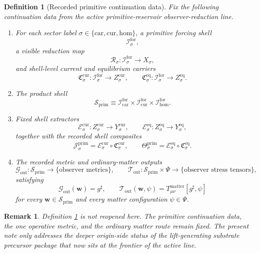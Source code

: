 \documentclass[11pt]{article}
\newcommand{\CompletedMetric}{g^{\sharp}}
\newcommand{\Car}{\mathrm{car}}
\newcommand{\Cur}{\mathrm{cur}}
\newcommand{\Hom}{\mathrm{hom}}
\newcommand{\ForSpace}[1]{\mathcal I_{#1}^{\mathrm{for}}}
\newcommand{\PrimShell}{\mathcal S_{\mathrm{prim}}}
\newcommand{\Reduction}[1]{\mathcal R_{#1}}
\newcommand{\CurrentCarrier}[1]{\mathfrak C_{#1}^{\mathrm{cur}}}
\newcommand{\EqCarrier}[1]{\mathfrak C_{#1}^{\mathrm{eq}}}
\newcommand{\CurrentExtract}[1]{\mathscr E_{#1}^{\mathrm{cur}}}
\newcommand{\EqExtract}[1]{\mathscr E_{#1}^{\mathrm{eq}}}
\newcommand{\PrimCurrent}[1]{\mathcal J_{#1}^{\mathrm{prim}}}
\newcommand{\PrimTheta}[1]{\Theta_{#1}^{\mathrm{prim}}}
\newcommand{\MetricOut}{\mathscr G_{\mathrm{out}}}
\newcommand{\MatterOut}{\mathscr T_{\mathrm{out}}}
\newtheorem{definition}{Definition}
\newtheorem{remark}{Remark}
\begin{document}
\begin{definition}[Recorded primitive continuation data]
\label{def:fixed}
Fix the following continuation data from the active primitive-reservoir observer-reduction line.
\begin{enumerate}
    \item For each sector label \(\sigma\in\{\Car,\Cur,\Hom\}\), a primitive forcing shell
    \[
    \ForSpace{\sigma},
    \]
    a visible reduction map
    \[
    \Reduction{\sigma}:\ForSpace{\sigma}\to X_{\sigma},
    \]
    and shell-level current and equilibrium carriers
    \[
    \CurrentCarrier{\sigma}:\ForSpace{\sigma}\to Z_{\sigma}^{\mathrm{cur}},
    \qquad
    \EqCarrier{\sigma}:\ForSpace{\sigma}\to Z_{\sigma}^{\mathrm{eq}}.
    \]
    \item The product shell
    \[
    \PrimShell
    \equiv
    \ForSpace{\Car}\times \ForSpace{\Cur}\times \ForSpace{\Hom}.
    \]
    \item Fixed shell extractors
    \[
    \CurrentExtract{\sigma}:Z_{\sigma}^{\mathrm{cur}}\to Y_{\sigma}^{\mathrm{cur}},
    \qquad
    \EqExtract{\sigma}:Z_{\sigma}^{\mathrm{eq}}\to Y_{\sigma}^{\mathrm{eq}},
    \]
    together with the recorded shell composites
    \begin{equation}
    \PrimCurrent{\sigma}
    =
    \CurrentExtract{\sigma}\circ \CurrentCarrier{\sigma},
    \qquad
    \PrimTheta{\sigma}
    =
    \EqExtract{\sigma}\circ \EqCarrier{\sigma}.
    \label{eq:primcomposites}
    \end{equation}
    \item The recorded metric and ordinary-matter outputs
    \[
    \MetricOut:\PrimShell\to\{\text{observer metrics}\},
    \qquad
    \MatterOut:\PrimShell\times\Psi\to\{\text{observer stress tensors}\},
    \]
    satisfying
    \begin{equation}
    \MetricOut(\mathbf w)=\CompletedMetric,
    \qquad
    \MatterOut(\mathbf w,\psi)
    =
    T_{\mu\nu}^{\mathrm{matter}}[\CompletedMetric,\psi]
    \label{eq:fixedoutputs}
    \end{equation}
    for every \(\mathbf w\in\PrimShell\) and every matter configuration \(\psi\in\Psi\).
\end{enumerate}
\end{definition}

\begin{remark}
Definition \ref{def:fixed} is not reopened here. The primitive continuation data, the one operative metric, and the ordinary matter route remain fixed. The present note only addresses the deeper origin-side status of the lift-generating substrate precursor package that now sits at the frontier of the active line.
\end{remark}
\end{document}
